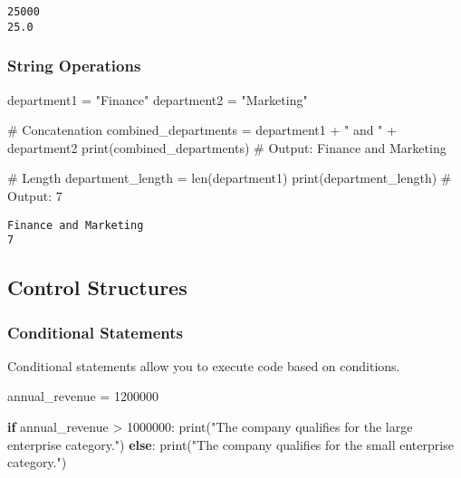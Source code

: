 \documentclass[
  letterpaper,
  DIV=11,
  numbers=noendperiod]{scrreprt}
\newenvironment{Shaded}{\begin{snugshade}}{\end{snugshade}}
\newcommand{\BuiltInTok}[1]{\textcolor[rgb]{0.00,0.23,0.31}{#1}}
\newcommand{\CommentTok}[1]{\textcolor[rgb]{0.37,0.37,0.37}{#1}}
\newcommand{\ControlFlowTok}[1]{\textcolor[rgb]{0.00,0.23,0.31}{\textbf{#1}}}
\newcommand{\DecValTok}[1]{\textcolor[rgb]{0.68,0.00,0.00}{#1}}
\newcommand{\NormalTok}[1]{\textcolor[rgb]{0.00,0.23,0.31}{#1}}
\newcommand{\OperatorTok}[1]{\textcolor[rgb]{0.37,0.37,0.37}{#1}}
\newcommand{\StringTok}[1]{\textcolor[rgb]{0.13,0.47,0.30}{#1}}
\begin{document}
\begin{verbatim}
25000
25.0
\end{verbatim}

\subsubsection{String Operations}\label{string-operations}

\begin{Shaded}
\begin{Highlighting}[]
\NormalTok{department1 }\OperatorTok{=} \StringTok{"Finance"}
\NormalTok{department2 }\OperatorTok{=} \StringTok{"Marketing"}

\CommentTok{\# Concatenation}
\NormalTok{combined\_departments }\OperatorTok{=}\NormalTok{ department1 }\OperatorTok{+} \StringTok{" and "} \OperatorTok{+}\NormalTok{ department2}
\BuiltInTok{print}\NormalTok{(combined\_departments)  }\CommentTok{\# Output: Finance and Marketing}

\CommentTok{\# Length}
\NormalTok{department\_length }\OperatorTok{=} \BuiltInTok{len}\NormalTok{(department1)}
\BuiltInTok{print}\NormalTok{(department\_length)  }\CommentTok{\# Output: 7}
\end{Highlighting}
\end{Shaded}

\begin{verbatim}
Finance and Marketing
7
\end{verbatim}

\subsection{Control Structures}\label{control-structures}

\subsubsection{Conditional Statements}\label{conditional-statements}

Conditional statements allow you to execute code based on conditions.

\begin{Shaded}
\begin{Highlighting}[]
\NormalTok{annual\_revenue }\OperatorTok{=} \DecValTok{1200000}

\ControlFlowTok{if}\NormalTok{ annual\_revenue }\OperatorTok{\textgreater{}} \DecValTok{1000000}\NormalTok{:}
    \BuiltInTok{print}\NormalTok{(}\StringTok{"The company qualifies for the large enterprise category."}\NormalTok{)}
\ControlFlowTok{else}\NormalTok{:}
    \BuiltInTok{print}\NormalTok{(}\StringTok{"The company qualifies for the small enterprise category."}\NormalTok{)}
\end{Highlighting}
\end{Shaded}
\end{document}
